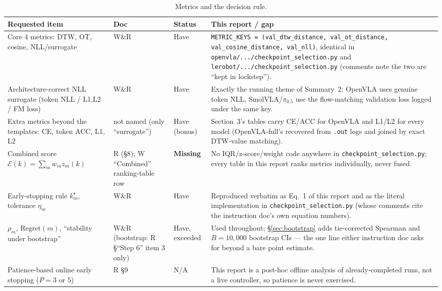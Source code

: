 \documentclass[11pt]{article}
\begin{document}
\begin{table}[h]
\centering
\footnotesize
\caption{Metrics and the decision rule.}
\begin{tabular}{p{3.1cm}p{1.0cm}p{1.6cm}p{8.0cm}}
\toprule
Requested item & Doc & Status & This report / gap \\
\midrule
Core 4 metrics: DTW, OT, cosine, NLL/surrogate & W\&R & Have &
\texttt{METRIC\_KEYS = (val\_dtw\_distance, val\_ot\_distance, val\_cosine\_distance, val\_nll)},
identical in \texttt{openvla/.../checkpoint\_selection.py} and
\texttt{lerobot/.../checkpoint\_selection.py} (comments note the two are ``kept in lockstep''). \\
Architecture-correct NLL surrogate (token NLL / L1,L2 / FM loss) & W\&R & Have &
Exactly the running theme of Summary~2: OpenVLA uses genuine token NLL, SmolVLA/$\pi_{0.5}$ use the
flow-matching validation loss logged under the same key. \\
Extra metrics beyond the templates: CE, token ACC, L1, L2 & not named (only ``surrogate'') & Have
(bonus) &
Section~3's tables carry CE/ACC for OpenVLA and L1/L2 for every model (OpenVLA-full's recovered from
\texttt{.out} logs and joined by exact DTW-value matching). \\
Combined score $\mathcal E(k)=\sum_m w_m z_m(k)$ & R (\S8); W ``Combined'' ranking-table row &
\textbf{Missing} &
No IQR/z-score/weight code anywhere in \texttt{checkpoint\_selection.py}; every table in this
report ranks metrics individually, never fused. \\
Early-stopping rule $k_m^\star$, tolerance $\eta_m$ & W\&R & Have &
Reproduced verbatim as Eq.~1 of this report and as the literal implementation in
\texttt{checkpoint\_selection.py} (whose comments cite the instruction doc's own equation numbers). \\
$\rho_m$, $\mathrm{Regret}(m)$, ``stability under bootstrap'' & W\&R (bootstrap: R \S``Step 6''
item 3 only) & Have, exceeded &
Used throughout; \S\ref{sec:bootstrap} adds tie-corrected Spearman and $B{=}10{,}000$ bootstrap CIs
--- the one line either instruction doc asks for beyond a bare point estimate. \\
Patience-based online early stopping ($P{=}3$ or $5$) & R \S9 & N/A &
This report is a post-hoc offline analysis of already-completed runs, not a live controller, so
patience is never exercised. \\
\bottomrule
\end{tabular}
\end{table}
\end{document}
